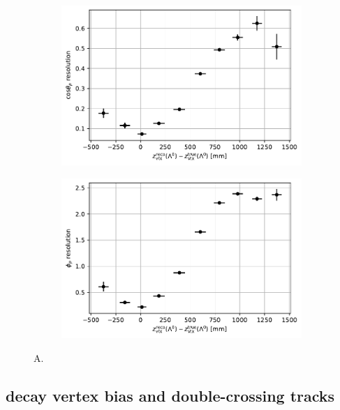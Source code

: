 \begin{figure}[t]
	\centering
	\begin{subfigure}{.45\textwidth}
		\includegraphics[width=\textwidth]{graphics/05-angular_distributions/MCRECO_p_theta_resolution_vs_L_endvertex_z_bias.pdf}
		\caption{}
		\label{fig:5:theta_resolution_vs_vertex_bias}
	\end{subfigure}
	\begin{subfigure}{.45\textwidth}
		\includegraphics[width=\textwidth]{graphics/05-angular_distributions/MCRECO_p_phi_resolution_vs_L_endvertex_z_bias.pdf}
		\caption{}
		\label{fig:5:phi_resolution_vs_vertex_bias}
	\end{subfigure}
	\caption{A.}
	\label{fig:5:angular_resolution_vs_vertex_bias}
\end{figure}

\subsection{\texorpdfstring{\lz}{Lambda} decay vertex bias and double-crossing tracks}
\label{sec:lambda_endvertex_bias}

